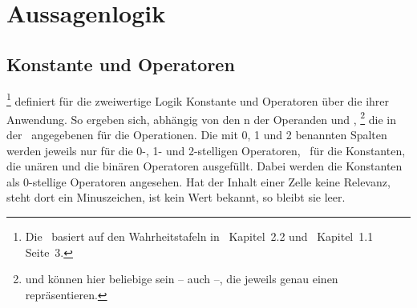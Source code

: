 \section{Aussagenlogik}%
\label{sec:Aussagenlogik}

\subsection{Konstante und Operatoren}%
\label{sub:Operatoren}

%
\footnote{%
	Die \tablename\ basiert auf den Wahrheitstafeln in~\cite{bib:Junktor} Kapitel~2.2 und~\cite{bib:Rautenberg} Kapitel~1.1 Seite~3.%
}
definiert für die zweiwertige Logik Konstante und Operatoren über die  ihrer Anwendung.
So ergeben sich, abhängig von den n der Operanden  und ,%
\footnote{%
	 und  können hier beliebige  sein -- auch  --, die jeweils genau einen  repräsentieren.%
}
die in der \tablename\ angegebenen  für die Operationen.
Die mit 0, 1 und 2 benannten Spalten werden jeweils nur für die 0-, 1- und 2-stelligen Operatoren, \textdh\ für die Konstanten, die unären und die binären Operatoren ausgefüllt.
Dabei werden die Konstanten als 0-stellige Operatoren angesehen.
Hat der Inhalt einer Zelle keine Relevanz, steht dort ein Minuszeichen, ist kein Wert bekannt, so bleibt sie leer.

